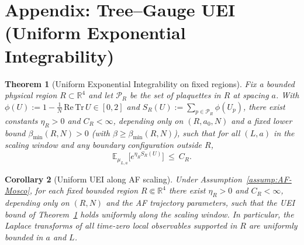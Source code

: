 \documentclass[11pt]{amsart}
\theoremstyle{plain}
\newtheorem{theorem}{Theorem}[section]
\newtheorem{corollary}[theorem]{Corollary}
\theoremstyle{definition}
\theoremstyle{remark}
\begin{document}
\section{Appendix: Tree--Gauge UEI (Uniform Exponential Integrability)}

\begin{theorem}[Uniform Exponential Integrability on fixed regions]\label{thm:uei-fixed-region}
Fix a bounded physical region $R\subset\mathbb{R}^4$ and let $\mathcal{P}_R$ be the set of plaquettes in $R$ at spacing $a$. With $\phi(U):=1-\tfrac{1}{N}\,\mathrm{Re\,Tr}\,U\in[0,2]$ and $S_R(U):=\sum_{p\in\mathcal{P}_R}\phi(U_p)$, there exist constants $\eta_R>0$ and $C_R<\infty$, depending only on $(R,a_0,N)$ and a fixed lower bound $\beta_{\min}(R,N)>0$ (with $\beta\ge \beta_{\min}(R,N)$), such that for all $(L,a)$ in the scaling window and any boundary configuration outside $R$,
\[
  \mathbb{E}_{\mu_{L,a}}\big[e^{\eta_R S_R(U)}\big]\ \le\ C_R.
\]
\end{theorem}
\begin{corollary}[Uniform UEI along AF scaling]\label{cor:uei-af-uniform}
Under Assumption~\ref{assump:AF-Mosco}, for each fixed bounded region $R\Subset\mathbb R^4$ there exist $\eta_R>0$ and $C_R<\infty$, depending only on $(R,N)$ and the AF trajectory parameters, such that the UEI bound of Theorem~\ref{thm:uei-fixed-region} holds uniformly along the scaling window. In particular, the Laplace transforms of all time-zero local observables supported in $R$ are uniformly bounded in $a$ and $L$.
\end{corollary}
\end{document}
